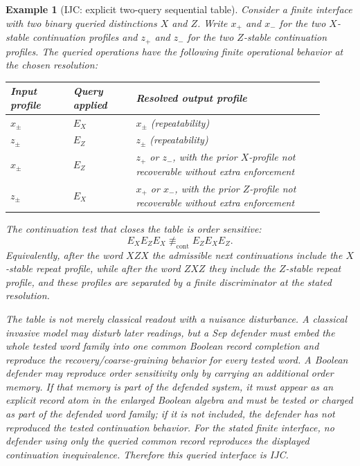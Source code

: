 \documentclass[11pt]{article}
\newtheorem{example}[theorem]{Example}
\begin{document}
\begin{example}[IJC: explicit two-query sequential table]\label{ex:two-query-table}
Consider a finite interface with two binary queried distinctions $X$ and $Z$.  Write $x_+$ and $x_-$ for the two $X$-stable continuation profiles and $z_+$ and $z_-$ for the two $Z$-stable continuation profiles.  The queried operations have the following finite operational behavior at the chosen resolution:
\begin{center}
\begin{tabular}{@{}p{0.18\linewidth}p{0.18\linewidth}p{0.54\linewidth}@{}}
\toprule
Input profile & Query applied & Resolved output profile \\
\midrule
$x_\pm$ & $E_X$ & $x_\pm$ (repeatability)\\
$z_\pm$ & $E_Z$ & $z_\pm$ (repeatability)\\
$x_\pm$ & $E_Z$ & $z_+$ or $z_-$, with the prior $X$-profile not recoverable without extra enforcement\\
$z_\pm$ & $E_X$ & $x_+$ or $x_-$, with the prior $Z$-profile not recoverable without extra enforcement\\
\bottomrule
\end{tabular}
\end{center}
The continuation test that closes the table is order sensitive:
\[
 E_XE_ZE_X \not\equiv_{\mathrm{cont}} E_ZE_XE_Z .
\]
Equivalently, after the word $XZX$ the admissible next continuations include the $X$-stable repeat profile, while after the word $ZXZ$ they include the $Z$-stable repeat profile, and these profiles are separated by a finite discriminator at the stated resolution.

The table is not merely classical readout with a nuisance disturbance.  A classical invasive model may disturb later readings, but a Sep defender must embed the whole tested word family into one common Boolean record completion and reproduce the recovery/coarse-graining behavior for every tested word.  A Boolean defender may reproduce order sensitivity only by carrying an additional order memory.  If that memory is part of the defended system, it must appear as an explicit record atom in the enlarged Boolean algebra and must be tested or charged as part of the defended word family; if it is not included, the defender has not reproduced the tested continuation behavior.  For the stated finite interface, no defender using only the queried common record reproduces the displayed continuation inequivalence.  Therefore this queried interface is IJC.
\end{example}
\end{document}
